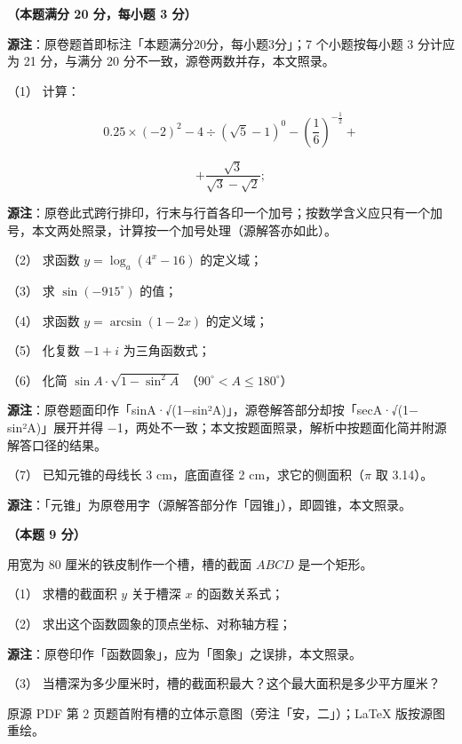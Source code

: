 \begin{question}
\textbf{（本题满分 20 分，每小题 3 分）} 

\begin{gktip}
\textbf{源注}：原卷题首即标注「本题满分20分，每小题3分」；7 个小题按每小题 3 分计应为 21 分，与满分 20 分不一致，源卷两数并存，本文照录。
\end{gktip}

（1） 计算：

\nopagebreak[4]
\[
0.25\times(-2)^2-4\div(\sqrt5-1)^0-\left(\frac16\right)^{-\frac12}+
\]

\nopagebreak[4]
\[
+\frac{\sqrt3}{\sqrt3-\sqrt2};
\]

\begin{gktip}
\textbf{源注}：原卷此式跨行排印，行末与行首各印一个加号；按数学含义应只有一个加号，本文两处照录，计算按一个加号处理（源解答亦如此）。
\end{gktip}

（2） 求函数 $y=\log_a(4^x-16)$ 的定义域；

（3） 求 $\sin(-915^\circ)$ 的值；

（4） 求函数 $y=\arcsin(1-2x)$ 的定义域；

（5） 化复数 $-1+i$ 为三角函数式；

（6） 化简 $\sin A\cdot\sqrt{1-\sin^2A}$ （$90^\circ<A\leqslant180^\circ$）

\begin{gktip}
\textbf{源注}：原卷题面印作「sinA·√(1$-$sin²A)」，源卷解答部分却按「secA·√(1$-$sin²A)」展开并得 $-$1，两处不一致；本文按题面照录，解析中按题面化简并附源解答口径的结果。
\end{gktip}

（7） 已知元锥的母线长 3 cm，底面直径 2 cm，求它的侧面积（$\pi$ 取 3.14）。

\begin{gktip}
\textbf{源注}：「元锥」为原卷用字（源解答部分作「园锥」），即圆锥，本文照录。
\end{gktip}

\Needspace{0.4\textheight}
\end{question}
\begin{question}
\textbf{（本题 9 分）} 

用宽为 80 厘米的铁皮制作一个槽，槽的截面 $ABCD$ 是一个矩形。

（1） 求槽的截面积 $y$ 关于槽深 $x$ 的函数关系式；

（2） 求出这个函数圆象的顶点坐标、对称轴方程；

\begin{gktip}
\textbf{源注}：原卷印作「函数圆象」，应为「图象」之误排，本文照录。
\end{gktip}

（3） 当槽深为多少厘米时，槽的截面积最大？这个最大面积是多少平方厘米？

\begin{gktip}
原源 PDF 第 2 页题首附有槽的立体示意图（旁注「安，二」）；LaTeX 版按源图重绘。
\end{gktip}
\nopagebreak[4]
\begin{center}\end{center}
\nopagebreak[4]
\end{question}

